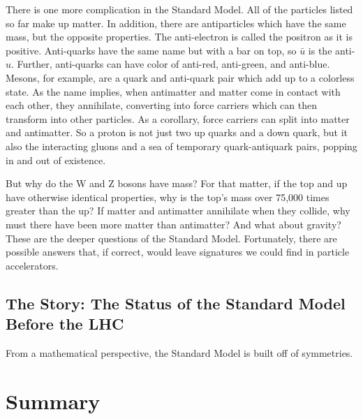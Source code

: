 There is one more complication in the Standard Model. All of the particles listed so far make up matter. In addition, there are antiparticles which have the same mass, but the opposite properties. The anti-electron is called the positron as it is positive. Anti-quarks have the same name but with a bar on top, so $\bar{u}$ is the anti-$u$. Further, anti-quarks can have color of anti-red, anti-green, and anti-blue. Mesons, for example, are a quark and anti-quark pair which add up to a colorless state. As the name implies, when antimatter and matter come in contact with each other, they annihilate, converting into force carriers which can then transform into other particles. As a corollary, force carriers can split into matter and antimatter. So a proton is not just two up quarks and a down quark, but it also the interacting gluons and a sea of temporary quark-antiquark pairs, popping in and out of existence.

But why do the W and Z bosons have mass? For that matter, if the top and up have otherwise identical properties, why is the top's mass over 75,000 times greater than the up? If matter and antimatter annihilate when they collide, why must there have been more matter than antimatter? And what about gravity? These are the deeper questions of the Standard Model. Fortunately, there are possible answers that, if correct, would leave signatures we could find in particle accelerators.

\subsection{The Story: The Status of the Standard Model Before the LHC}
\label{sec:SMpreLHC}

From a mathematical perspective, the Standard Model is built off of symmetries. 

\section{Summary}
\label{sec:intro_summary}